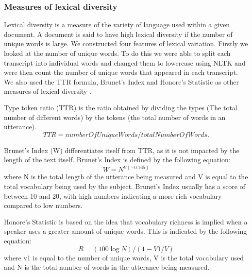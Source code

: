 \documentclass[10pt, letterpaper, twoside, openany]{thesis}
\begin{document}
\subsubsection{Measures of lexical diversity}
Lexical diversity is a measure of the variety of language used within a given document. A document is said to have high lexical diversity if the number of unique words is large. We constructed four features of lexical variation. Firstly we looked at the number of unique words. To do this we were able to split each transcript into individual words and changed them to lowercase using NLTK and were then count the number of unique words that appeared in each transcript. We also used the TTR formula, Brunet's Index and Honore's Statistic as other measures of lexical diversity \cite{Bucks2000}. 
\par 
Type token ratio (TTR) is the ratio obtained by dividing the types (The total number of different words) by the tokens (the total number of words in an utterance).
\begin{equation} \label{x1}
TTR = numberOfUniqueWords / totalNumberOfWords.
\end{equation}
\par 
Brunet's Index (W) differentiates itself from TTR, as it is not impacted by the length of the text itself. Brunet's Index is defined by the following equation:
\begin{equation} \label{x2}
W = N^{V(-0.165)}
\end{equation}
where N is the total length of the utterance being measured and V is equal to the total vocabulary being used by the subject. Brunet's Index usually has a score of between 10 and 20, with high numbers indicating a more rich vocabulary compared to low numbers. \newline
\par 
Honore's Statistic is based on the idea that vocabulary richness is implied when a speaker uses a greater amount of unique words. This is indicated by the following equation: 
\begin{equation} \label{x3}
R = (100 \log N) / (1 - V1/V)
\end{equation}
where v1 is equal to the number of unique words, V is the total vocabulary used and N is the total number of words in the utterance being measured.
\end{document}
